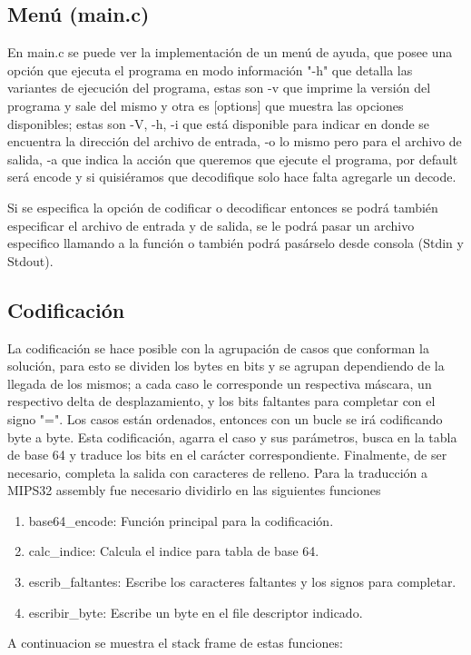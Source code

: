 \documentclass[a4paper,11pt, margin=1in]{article}
\begin{document}
\subsection{Menú (main.c)}
En  main.c se puede ver la implementación de un menú de ayuda, que posee una opción 
que ejecuta el programa en modo información "-h" que detalla las variantes de 
ejecución del programa, estas son -v que imprime la versión del programa y 
sale del mismo y otra es [options] que muestra las opciones disponibles; 
estas son -V, -h, -i que está disponible para indicar en donde se encuentra la dirección del archivo de entrada, 
-o lo mismo pero para el archivo de salida, 
-a que indica la acción que queremos que ejecute el programa, por default será encode 
y si quisiéramos que decodifique solo hace falta agregarle un decode.

Si se especifica la opción de codificar o decodificar entonces se podrá 
también especificar el archivo de entrada y de salida, se le podrá pasar un 
archivo especifico llamando a la función o también podrá pasárselo desde consola (Stdin y Stdout).

\newpage
\subsection{Codificación}
La codificación se hace posible con la agrupación de casos que conforman la solución, 
para esto se dividen los bytes en bits y se agrupan dependiendo de la llegada de los mismos; 
a cada caso le corresponde un respectiva máscara, un respectivo delta de desplazamiento, 
y los bits faltantes para completar con el signo "=". 
Los casos están ordenados, entonces con un bucle se irá codificando byte a byte. 
Esta codificación, agarra el caso y sus parámetros, busca en la tabla de base 64 
y traduce los bits en el carácter correspondiente. 
Finalmente, de ser necesario, completa la salida con caracteres de relleno.
\newline
Para la traducción a MIPS32 assembly fue necesario dividirlo en las siguientes funciones
\begin{enumerate}

\item base64\_encode: Función principal para la codificación.
\item calc\_indice: Calcula el indice para tabla de base 64.
\item escrib\_faltantes: Escribe los caracteres faltantes y los signos para completar.
\item escribir\_byte: Escribe un byte en el file descriptor indicado.

\end{enumerate}
\newline
A continuacion se muestra el stack frame de estas funciones:
\end{document}
